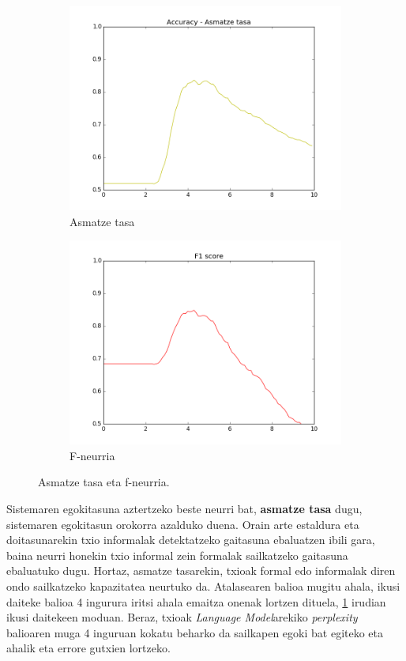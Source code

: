\documentclass[information,article,submit,moreauthors,pdftex,10pt,a4paper]{Definitions/mdpi}
\begin{document}
\begin{figure}[H]
  \centering
  \begin{subfigure}[b]{0.48\linewidth}
    \includegraphics[width=\linewidth]{accuracy}
    \caption{Asmatze tasa}
    \label{fig:acc}
  \end{subfigure}
  \begin{subfigure}[b]{0.48\linewidth}
    \includegraphics[width=\linewidth]{fmeasure}
    \caption{F-neurria}
    \label{fig:f1}
  \end{subfigure}
  \caption{Asmatze tasa eta f-neurria.}
  \label{fig:acc f1}
\end{figure}

Sistemaren egokitasuna aztertzeko beste neurri bat, \textbf{asmatze tasa} dugu, sistemaren egokitasun orokorra azalduko duena. Orain arte estaldura eta doitasunarekin txio informalak detektatzeko gaitasuna ebaluatzen ibili gara, baina neurri honekin txio informal zein formalak sailkatzeko gaitasuna ebaluatuko dugu. Hortaz, asmatze tasarekin, txioak formal edo informalak diren ondo sailkatzeko kapazitatea neurtuko da. Atalasearen balioa mugitu ahala, ikusi daiteke balioa 4 ingurura iritsi ahala emaitza onenak lortzen dituela, \ref{fig:acc} irudian ikusi daitekeen moduan. Beraz, txioak \textit{Language Model}arekiko \textit{perplexity} balioaren muga 4 inguruan kokatu beharko da sailkapen egoki bat egiteko eta ahalik eta errore gutxien lortzeko.
\end{document}
